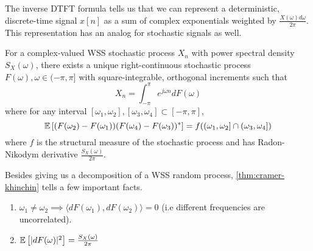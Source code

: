 The inverse DTFT formula tells us that we can represent a deterministic, discrete-time signal $x[n]$ as a sum of complex exponentials weighted by $\frac{X(\omega)d\omega}{2\pi}$.
This representation has an analog for stochastic signals as well.
\begin{theorem}
	For a complex-valued WSS stochastic process $X_n$ with power spectral density $S_X(\omega)$, there exists a unique right-continuous stochastic process $F(\omega), \omega\in(-\pi,\pi]$ with square-integrable, orthogonal increments such that \[
		X_n = \int_{-\pi}^{\pi}e^{j\omega n}dF(\omega)
	\] where for any interval $[\omega_1,\omega_2], [\omega_3, \omega_4]\subset [-\pi,\pi]$, \[
		\mathbb{E}\left[(F(\omega_2)-F(\omega_1))(F(\omega_4) - F(\omega_3))^*\right] = f((\omega_1,\omega_2] \cap (\omega_3, \omega_4])
	\] where $f$ is the structural measure of the stochastic process and has Radon-Nikodym derivative $\frac{S_X(\omega)}{2\pi}$.
	\label{thm:cramer-khinchin}
\end{theorem}
Besides giving us a decomposition of a WSS random process, \cref{thm:cramer-khinchin} tells a few important facts.
\begin{enumerate}
	\item $\omega_1\neq\omega_2 \implies \langle dF(\omega_1), dF(\omega_2) \rangle = 0$ (i.e different frequencies are uncorrelated).
	\item $\mathbb{E}\left[|dF(\omega)|^2\right] = \frac{S_X(\omega)}{2\pi}$
\end{enumerate}
